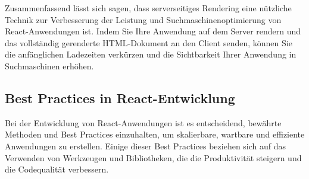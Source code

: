 Zusammenfassend lässt sich sagen, dass serverseitiges Rendering eine nützliche Technik zur Verbesserung der Leistung und Suchmaschinenoptimierung von React-Anwendungen ist. Indem Sie Ihre Anwendung auf dem Server rendern und das vollständig gerenderte HTML-Dokument an den Client senden, können Sie die anfänglichen Ladezeiten verkürzen und die Sichtbarkeit Ihrer Anwendung in Suchmaschinen erhöhen.

\subsection{Best Practices in React-Entwicklung}
 Bei der Entwicklung von React-Anwendungen ist es entscheidend, bewährte Methoden und Best Practices einzuhalten, um skalierbare, wartbare und effiziente Anwendungen zu erstellen. Einige dieser Best Practices beziehen sich auf das Verwenden von Werkzeugen und Bibliotheken, die die Produktivität steigern und die Codequalität verbessern. 
